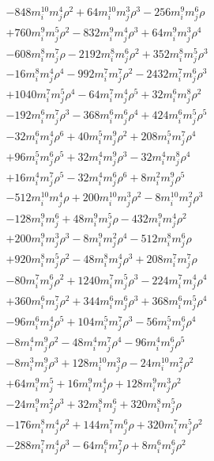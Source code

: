 {\begin{align*}
&-848m_i^{10} m_j^{4} \rho^{2}+64m_i^{10} m_j^{3} \rho^{3}-256m_i^{9} m_j^{6} \rho\\
&+760m_i^{9} m_j^{5} \rho^{2}-832m_i^{9} m_j^{4} \rho^{3}+64m_i^{9} m_j^{3} \rho^{4}\\
&-608m_i^{8} m_j^{7} \rho-2192m_i^{8} m_j^{6} \rho^{2}+352m_i^{8} m_j^{5} \rho^{3}\\
&-16m_i^{8} m_j^{4} \rho^{4}-992m_i^{7} m_j^{7} \rho^{2}-2432m_i^{7} m_j^{6} \rho^{3}\\
&+1040m_i^{7} m_j^{5} \rho^{4}-64m_i^{7} m_j^{4} \rho^{5}+32m_i^{6} m_j^{8} \rho^{2}\\
&-192m_i^{6} m_j^{7} \rho^{3}-368m_i^{6} m_j^{6} \rho^{4}+424m_i^{6} m_j^{5} \rho^{5}\\
&-32m_i^{6} m_j^{4} \rho^{6}+40m_i^{5} m_j^{9} \rho^{2}+208m_i^{5} m_j^{7} \rho^{4}\\
&+96m_i^{5} m_j^{6} \rho^{5}+32m_i^{4} m_j^{9} \rho^{3}-32m_i^{4} m_j^{8} \rho^{4}\\
&+16m_i^{4} m_j^{7} \rho^{5}-32m_i^{4} m_j^{6} \rho^{6}+8m_i^{2} m_j^{9} \rho^{5}\\
&-512m_i^{10} m_j^{4} \rho+200m_i^{10} m_j^{3} \rho^{2}-8m_i^{10} m_j^{2} \rho^{3}\\
&-128m_i^{9} m_j^{6}+48m_i^{9} m_j^{5} \rho-432m_i^{9} m_j^{4} \rho^{2}\\
&+200m_i^{9} m_j^{3} \rho^{3}-8m_i^{9} m_j^{2} \rho^{4}-512m_i^{8} m_j^{6} \rho\\
&+920m_i^{8} m_j^{5} \rho^{2}-48m_i^{8} m_j^{4} \rho^{3}+208m_i^{7} m_j^{7} \rho\\
&-80m_i^{7} m_j^{6} \rho^{2}+1240m_i^{7} m_j^{5} \rho^{3}-224m_i^{7} m_j^{4} \rho^{4}\\
&+360m_i^{6} m_j^{7} \rho^{2}+344m_i^{6} m_j^{6} \rho^{3}+368m_i^{6} m_j^{5} \rho^{4}\\
&-96m_i^{6} m_j^{4} \rho^{5}+104m_i^{5} m_j^{7} \rho^{3}-56m_i^{5} m_j^{6} \rho^{4}\\
&-8m_i^{4} m_j^{9} \rho^{2}-48m_i^{4} m_j^{7} \rho^{4}-96m_i^{4} m_j^{6} \rho^{5}\\
&-8m_i^{3} m_j^{9} \rho^{3}+128m_i^{10} m_j^{3} \rho-24m_i^{10} m_j^{2} \rho^{2}\\
&+64m_i^{9} m_j^{5}+16m_i^{9} m_j^{4} \rho+128m_i^{9} m_j^{3} \rho^{2}\\
&-24m_i^{9} m_j^{2} \rho^{3}+32m_i^{8} m_j^{6}+320m_i^{8} m_j^{5} \rho\\
&-176m_i^{8} m_j^{4} \rho^{2}+144m_i^{7} m_j^{6} \rho+320m_i^{7} m_j^{5} \rho^{2}\\
&-288m_i^{7} m_j^{4} \rho^{3}-64m_i^{6} m_j^{7} \rho+8m_i^{6} m_j^{6} \rho^{2}\\

\end{align*}}
